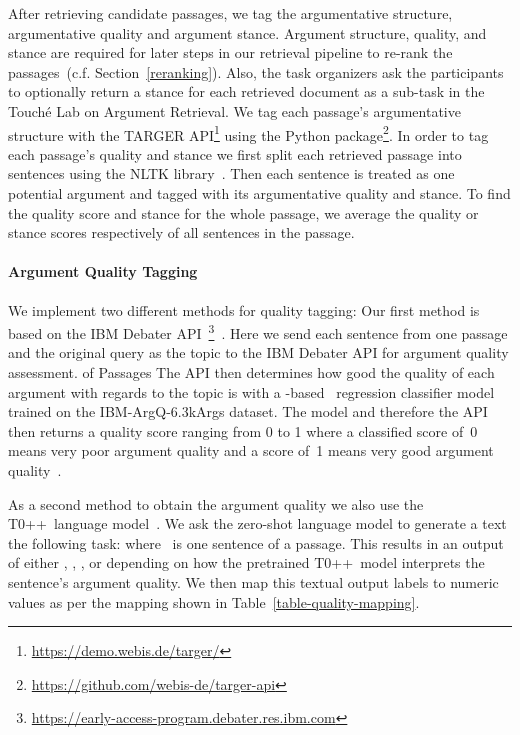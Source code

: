 After retrieving candidate passages, we tag the argumentative structure, argumentative quality and argument stance.
Argument structure, quality, and stance are required for later steps in our retrieval pipeline to re-rank the passages~(c.f. Section~\ref{reranking}).
Also, the task organizers ask the participants to optionally return a stance for each retrieved document as a sub-task in the Touché Lab on Argument Retrieval.
We tag each passage's argumentative structure with the TARGER API\footnote{\url{https://demo.webis.de/targer/}} using the  Python package\footnote{\url{https://github.com/webis-de/targer-api}}.
In order to tag each passage's quality and stance we first split each retrieved passage into sentences using the NLTK library~\cite{BirdLK2009}.
Then each sentence is treated as one potential argument and tagged with its argumentative quality and stance.
To find the quality score and stance for the whole passage, we average the quality or stance scores respectively of all sentences in the passage.

\paragraph{Argument Quality Tagging}


We implement two different methods for quality tagging:
Our first method is based on the IBM Debater API~\footnote{\url{https://early-access-program.debater.res.ibm.com}}~\cite{ToledoGCFVLJAS2019}.
Here we send each sentence from one passage and the original query as the topic to the IBM Debater API for argument quality assessment. of Passages
The API then determines how good the quality of each argument with regards to the topic is with a \Bert-based~\cite{DevlinCLT2019} regression classifier model trained on the IBM-ArgQ-6.3kArgs dataset. The model and therefore the API then returns a quality score ranging from 0 to 1 where a classified score of~0 means very poor argument quality and a score of~1 means very good argument quality~\cite{ToledoGCFVLJAS2019}.

As a second method to obtain the argument quality we also use the T0++~language model~\cite{SanhWRBSACSLRDBXTSSKCNDCJWMSYPBWNRSSFFTBGBWR2021}.
We ask the zero-shot language model to generate a text the following task: \hspace{1.5em}  where ~is one sentence of a passage.
This results in an output of either , , , or  depending on how the pretrained T0++~model interprets the sentence's argument quality.
We then map this textual output labels to numeric values as per the mapping shown in Table~\ref{table-quality-mapping}.

